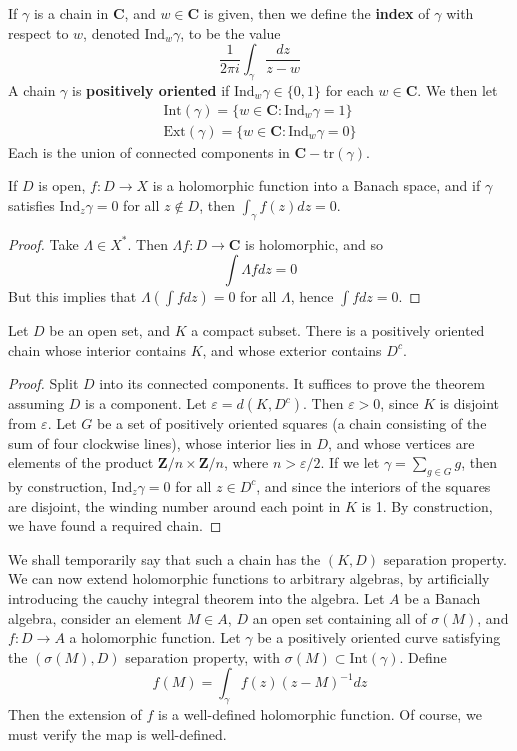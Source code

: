 If $\gamma$ is a chain in $\mathbf{C}$, and $w \in \mathbf{C}$ is given, then we define the {\bf index} of $\gamma$ with respect to $w$, denoted $\text{Ind}_w \gamma$, to be the value
%
\[ \frac{1}{2 \pi i} \int_\gamma \frac{dz}{z - w} \]
%
A chain $\gamma$ is {\bf positively oriented} if $\text{Ind}_w \gamma \in \{ 0, 1 \}$ for each $w \in \mathbf{C}$. We then let
%
\begin{align*}
    \text{Int}(\gamma) = \{ w \in \mathbf{C} : \text{Ind}_w \gamma = 1 \} \\
    \text{Ext}(\gamma) = \{ w \in \mathbf{C} : \text{Ind}_w \gamma = 0 \}
\end{align*}
%
Each is the union of connected components in $\mathbf{C} - \text{tr}(\gamma)$.

\begin{lemma} \label{banachcauchy}
    If $D$ is open, $f: D \to X$ is a holomorphic function into a Banach space, and if $\gamma$ satisfies $\text{Ind}_z \gamma = 0$ for all $z \not\in D$, then $\int_\gamma f(z) dz = 0$.
\end{lemma}
\begin{proof}
    Take $\Lambda \in X^*$. Then $\Lambda f: D \to \mathbf{C}$ is holomorphic, and so
    \[ \int \Lambda f dz = 0 \]
    But this implies that $\Lambda(\int f dz) = 0$ for all $\Lambda$, hence $\int f dz = 0$.
\end{proof}

\begin{lemma}
    Let $D$ be an open set, and $K$ a compact subset. There is a positively oriented chain whose interior contains $K$, and whose exterior contains $D^c$.
\end{lemma}
\begin{proof}
    Split $D$ into its connected components. It suffices to prove the theorem assuming $D$ is a component. Let $\varepsilon = d(K,D^c)$. Then $\varepsilon > 0$, since $K$ is disjoint from $\varepsilon$. Let $G$ be a set of positively oriented squares (a chain consisting of the sum of four clockwise lines), whose interior lies in $D$, and whose vertices are elements of the product $\mathbf{Z}/n \times \mathbf{Z}/n$, where $n > \varepsilon / 2$. If we let $\gamma = \sum_{g \in G} g$, then by construction, $\text{Ind}_z \gamma = 0$ for all $z \in D^c$, and since the interiors of the squares are disjoint, the winding number around each point in $K$ is 1. By construction, we have found a required chain.
\end{proof}

We shall temporarily say that such a chain has the $(K,D)$ separation property. We can now extend holomorphic functions to arbitrary algebras, by artificially introducing the cauchy integral theorem into the algebra. Let $A$ be a Banach algebra, consider an element $M \in A$, $D$ an open set containing all of $\sigma(M)$, and $f:D \to A$ a holomorphic function. Let $\gamma$ be a positively oriented curve satisfying the $(\sigma(M), D)$ separation property, with $\sigma(M) \subset \text{Int}(\gamma)$. Define
%
\[ f(M) = \int_\gamma f(z) (z - M)^{-1} dz \]
%
Then the extension of $f$ is a well-defined holomorphic function. Of course, we must verify the map is well-defined.


